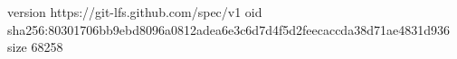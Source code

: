 version https://git-lfs.github.com/spec/v1
oid sha256:80301706bb9ebd8096a0812adea6e3c6d7d4f5d2feecaccda38d71ae4831d936
size 68258

